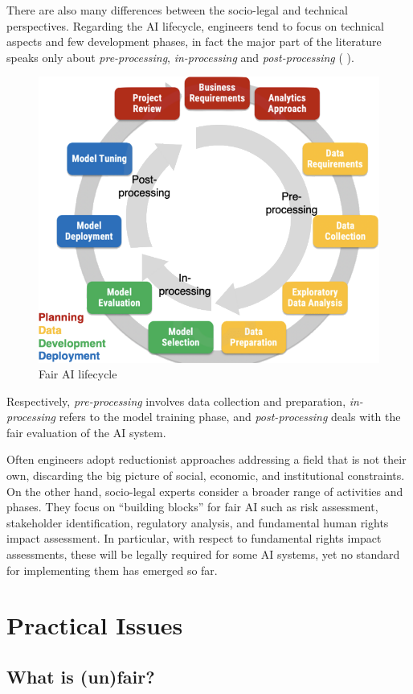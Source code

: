 \documentclass[12pt,a4paper,openright,twoside]{book}
\begin{document}
There are also many differences between the socio-legal and technical perspectives. Regarding the \ac{AI} lifecycle, engineers tend to focus on technical aspects and few development phases, in fact the major part of the literature speaks only about \textit{pre-processing}, \textit{in-processing} and \textit{post-processing} ( \cite{DBLP:conf/ijcai/CalegariCMO23}).
%
\begin{figure}
    \centering
    \includegraphics[width=.6\linewidth]{figures/ai-lifecycle.png}
    \caption{Fair \ac{AI} lifecycle}
    \label{fig:ai-lifecycle}
\end{figure}
%
Respectively, \textit{pre-processing} involves data collection and preparation, \textit{in-processing} refers to the model training phase, and \textit{post-processing} deals with the fair evaluation of the \ac{AI} system.

Often engineers adopt reductionist approaches addressing a field that is not their own, discarding the big picture of social, economic, and institutional constraints.
%
On the other hand, socio-legal experts consider a broader range of activities and phases. They focus on ``building blocks'' for fair \ac{AI} such as risk assessment, stakeholder identification, regulatory analysis, and fundamental human rights impact assessment. In particular, with respect to fundamental rights impact assessments, these will be legally required for some \ac{AI} systems, yet no standard for implementing them has emerged so far.




\section{Practical Issues}

\subsection{What is (un)fair?}
\end{document}
